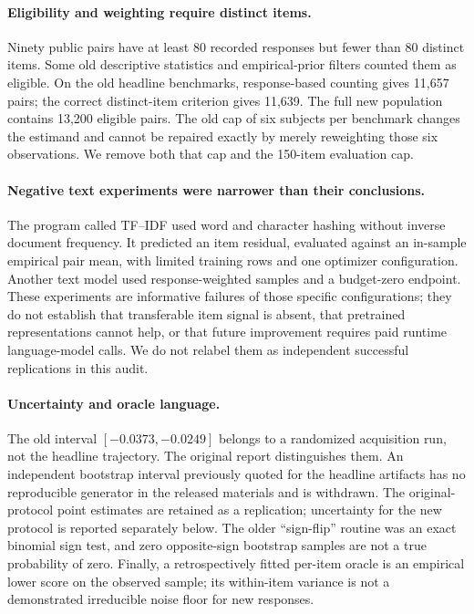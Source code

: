 \documentclass{article}
\begin{document}
\paragraph{Eligibility and weighting require distinct items.}
Ninety public pairs have at least 80 recorded responses but fewer than
80 distinct items. Some old descriptive statistics and empirical-prior filters
counted them as eligible. On the old headline benchmarks, response-based
counting gives 11,657 pairs; the correct distinct-item criterion gives
11,639. The full new population contains 13,200 eligible pairs. The old
cap of six subjects per benchmark changes the estimand and cannot be repaired
exactly by merely reweighting those six observations. We remove both that cap
and the 150-item evaluation cap.

\paragraph{Negative text experiments were narrower than their conclusions.}
The program called TF--IDF used word and character hashing without inverse
document frequency. It predicted an item residual, evaluated against an
in-sample empirical pair mean, with limited training rows and one optimizer
configuration. Another text model used response-weighted samples and a
budget-zero endpoint. These experiments are informative failures of those
specific configurations; they do not establish that transferable item signal
is absent, that pretrained representations cannot help, or that future
improvement requires paid runtime language-model calls. We do not relabel
them as independent successful replications in this audit.

\paragraph{Uncertainty and oracle language.}
The old interval $[-0.0373,-0.0249]$ belongs to a randomized acquisition run,
not the headline trajectory. The original report distinguishes them. An
independent bootstrap interval previously quoted for the headline artifacts
has no reproducible generator in the released materials and is withdrawn.
The original-protocol point estimates are retained as a replication;
uncertainty for the new protocol is reported separately below.
The older ``sign-flip'' routine was an exact binomial sign test, and zero
opposite-sign bootstrap samples are not a true probability of zero.
Finally, a retrospectively fitted per-item oracle is an empirical lower
score on the observed sample; its within-item variance is not a demonstrated
irreducible noise floor for new responses.
\end{document}
